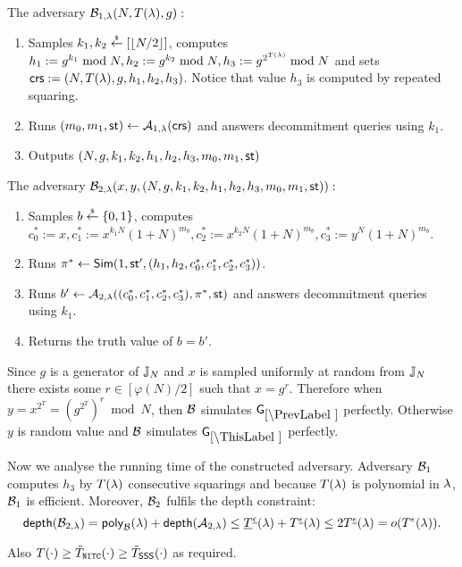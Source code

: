 The adversary $\mathcal{B}_{1,\lambda}(N, T(\lambda), g):$
\vspace{-2mm}
\begin{enumerate}
\item Samples $k_1, k_2 \stackrel{{\scriptscriptstyle\$}}{\leftarrow} [\left\lfloor N/2 \right\rfloor]$, computes $h_1 := g^{k_1} \bmod N, h_2 := g^{k_2} \bmod N,  h_3 := g^{2^{T(\lambda)}} \bmod N$ and sets $\mathsf{crs}:=(N, T(\lambda), g, h_1, h_2, h_3)$. Notice that value $h_3$ is computed by repeated squaring.
\item Runs $(m_0, m_1, \mathsf{st}) \leftarrow \mathcal{A}_{1, \lambda}(\mathsf{crs})$ and answers decommitment queries using $k_1$.
\item Outputs $(N,g,k_1, k_2, h_1,h_2,h_3, m_0, m_1, \mathsf{st})$
\end{enumerate}

The adversary $\mathcal{B}_{2,\lambda}(x,y,(N,g,k_1, k_2, h_1,h_2,h_3, m_0, m_1, \mathsf{st})):$
\vspace{-2mm}
\begin{enumerate}
\item Samples $b \stackrel{{\scriptscriptstyle\$}}{\leftarrow} \{0,1\}$, computes $c_0^*:=x, c_1^*:=x^{k_1N}(1+N)^{m_b}, c_2^*:=x^{k_2N}(1+N)^{m_b}, c_3^*:=y^{N}(1+N)^{m_b}$.
\item Runs $\pi^* \leftarrow \mathsf{Sim}(1, \mathsf{st}', (h_1, h_2, c_0^*, c_1^*, c_2^*, c_3^*))$.
\item Runs $b' \leftarrow \mathcal{A}_{2, \lambda}((c_0^*, c_1^*, c_2^*, c_3^*), \pi^*, \mathsf{st})$ and answers decommitment queries using $k_1$.
\item Returns the truth value of $b=b'$.
\end{enumerate}
Since $g$ is a generator of $\mathbb{J}_N$ and $x$ is sampled uniformly at random from $\mathbb{J}_N$ there exists some $r \in [\varphi(N)/2]$ such that $x = g^{r}$. Therefore when $y = x^{2^T} = (g^{2^T})^{r} \bmod N$, then $\mathcal{B}$ simulates $\games_\prevgame$ perfectly. Otherwise $y$ is random value and $\mathcal{B}$ simulates $\games_\thisgame$ perfectly. 

Now we analyse the running time of the constructed adversary. Adversary $\mathcal{B}_1$ computes $h_3$ by $T(\lambda)$ consecutive squarings and because $T(\lambda)$ is polynomial in $\lambda$, $\mathcal{B}_1$ is efficient. Moreover, $\mathcal{B}_2$ fulfils the depth constraint:
\[ \mathsf{depth}(\mathcal{B}_{2,\lambda}) = \mathsf{poly}_{\mathcal{B}}(\lambda) + \mathsf{depth}(\mathcal{A}_{2,\lambda}) \leq \underline{T}^{\underline{\epsilon}}(\lambda) + T^{\underline{\epsilon}}(\lambda) \leq 2 T^{\underline{\epsilon}}(\lambda) = o(T^{\epsilon}(\lambda)). \] 

Also $T(\cdot) \geq \tilde{T}_{\mathtt{NITC}}(\cdot) \geq \tilde{T}_\mathsf{SSS}(\cdot)$ as required.

%




